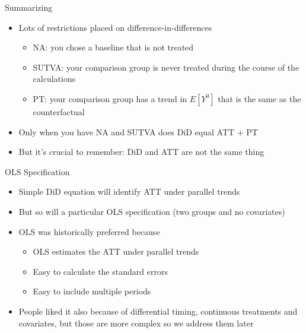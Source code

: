 \documentclass{beamer}
\begin{document}
\begin{frame}{Summarizing}

\begin{itemize}

\item Lots of restrictions placed on difference-in-differences
	\begin{itemize}
	\item NA: you chose a baseline that is not treated
	\item SUTVA: your comparison group is never treated during the course of the calculations
	\item PT: your comparison group has a trend in $E[Y^0]$ that is the same as the counterfactual 
	\end{itemize}
\item Only when you have NA and SUTVA does DiD equal ATT + PT
\item But it's crucial to remember: DiD and ATT are not the same thing

\end{itemize}

\end{frame}








\begin{frame}{OLS Specification}
	
	\begin{itemize}
	\item Simple DiD equation will identify ATT under parallel trends
	\item But so will a particular OLS specification (two groups and no covariates)
	\item OLS was historically preferred because
		\begin{itemize}
		\item OLS estimates the ATT under parallel trends
		\item Easy to calculate the standard errors
		\item Easy to include multiple periods
		\end{itemize}
	\item People liked it also because of differential timing, continuous treatments and covariates, but those are more complex so we address them later
	\end{itemize}
\end{frame}
\end{document}
